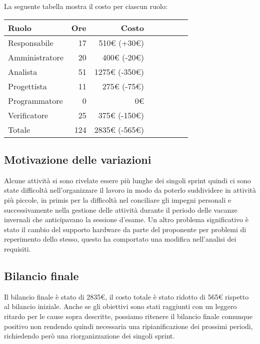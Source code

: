 La seguente tabella mostra il costo per ciascun ruolo:
\begin{table}[ht]
    \begin{tabularx}{\linewidth}{X|rrrrrrr}
    \rowcolor{gray!30}Ruolo & Ore & Costo \\
    \hline
    Responsabile                            & 17 & 510€ (+30€)\\
    \rowcolor{gray!10}Amministratore        & 20 & 400€ (-20€) \\
    Analista                                & 51 & 1275€ (-350€)\\
    \rowcolor{gray!10}Progettista           & 11 & 275€ (-75€) \\
    Programmatore                           & 0 & 0€ \\
    \rowcolor{gray!10}Verificatore          & 25 & 375€ (-150€) \\
    \hline Totale                           & 124 & 2835€ (-565€) \\ 
    \end{tabularx}
\end{table}

\subsection{Motivazione delle variazioni}

Alcune attività si sono rivelate essere più lunghe dei singoli sprint quindi ci sono state difficoltà nell'organizzare il lavoro in modo da poterlo suddividere in attività più piccole, in primis per la difficoltà nel conciliare gli impegni personali e successivamente nella gestione delle attività durante il periodo delle vacanze invernali che anticipavano la sessione d'esame.  
Un altro problema significativo è stato il cambio del supporto hardware da parte del proponente per problemi di reperimento dello stesso, questo ha comportato una modifica nell'analisi dei requisiti.

\subsection{Bilancio finale}

Il bilancio finale è stato di 2835€, il costo totale è stato ridotto di 565€ rispetto al bilancio iniziale. Anche se gli obiettivi sono stati raggiunti con un leggero ritardo per le cause sopra descritte, possiamo ritenere il bilancio finale comunque positivo non rendendo quindi necessaria una ripianificazione dei prossimi periodi, richiedendo però una riorganizzazione dei singoli sprint.
